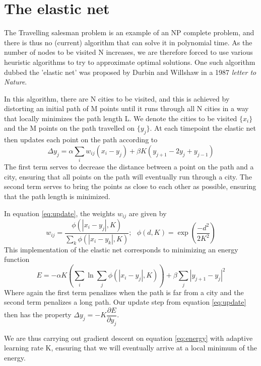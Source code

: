 \documentclass{article}
\begin{document}
\section{The elastic net}

The Travelling salesman problem is an example of an NP complete problem, and there is thus no (current) algorithm that can solve it in polynomial time. As the number of nodes to be visited N increases, we are therefore forced to use various heuristic algorithms to try to approximate optimal solutions. One such algorithm dubbed the 'elastic net' was proposed by Durbin and Willshaw in a 1987 \textit{letter to Nature}.

In this algorithm, there are N cities to be visited, and this is achieved by distorting an initial path of M points until it runs through all N cities in a way that locally minimizes the path length L.
We denote the cities to be visited $\{x_i\}$ and the M points on the path travelled on $\{y_j\}$. At each timepoint the elastic net then updates each point on the path according to
\begin{equation}\label{eq:update}
\Delta y_j =\alpha \sum_i{w_{ij}(x_i-y_j) + \beta K (y_{j+1} - 2y_j + y_{j-1})} 
\end{equation}
The first term serves to decrease the distance between a point on the path and a city, ensuring that all points on the path will eventually run through a city. The second term serves to bring the points as close to each other as possible, ensuring that the path length is minimized.

In equation \ref{eq:update}, the weights $w_{ij}$ are given by
\begin{equation}
w_{ij} = \dfrac{\phi(|x_i-y_j|, K)}{\sum_k{\phi(|x_i-y_k|, K)}}
; ~~~
\phi (d, K) = \exp{(\dfrac{-d^2}{2K^2})}
\end{equation}
This implementation of the elastic net corresponds to minimizing an energy function
\begin{equation}\label{eq:energy}
E = -\alpha K (\sum_i{\ln{\sum_j{\phi(|x_i-y_j|, K)}}})+\beta \sum_j{|y_{j+1}-y_j|^2}
\end{equation}
Where again the first term penalizes when the path is far from a city and the second term penalizes a long path.
Our update step from equation \ref{eq:update} then has the property
$
\Delta y_j = -K \dfrac{\partial E}{\partial y_j}
$.

We are thus carrying out gradient descent on equation \ref{eq:energy} with adaptive learning rate K, ensuring that we will eventually arrive at a local minimum of the energy.
\end{document}
